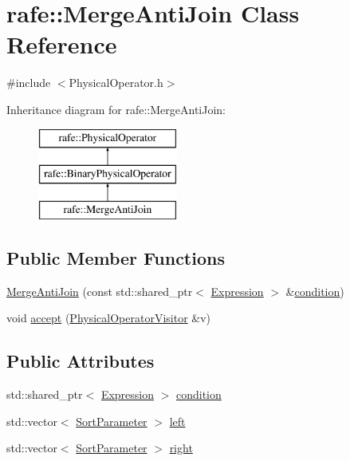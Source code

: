 \hypertarget{classrafe_1_1_merge_anti_join}{\section{rafe\+:\+:Merge\+Anti\+Join Class Reference}
\label{classrafe_1_1_merge_anti_join}
}


{\ttfamily \#include $<$Physical\+Operator.\+h$>$}

Inheritance diagram for rafe\+:\+:Merge\+Anti\+Join\+:\begin{figure}[H]
\begin{center}
\leavevmode
\includegraphics[height=3.000000cm]{classrafe_1_1_merge_anti_join}
\end{center}
\end{figure}
\subsection*{Public Member Functions}
\begin{DoxyCompactItemize}
\item 
\hyperlink{classrafe_1_1_merge_anti_join_ad67fe6bf33d22aa9e86cc7b022509adf}{Merge\+Anti\+Join} (const std\+::shared\+\_\+ptr$<$ \hyperlink{classrafe_1_1_expression}{Expression} $>$ \&\hyperlink{classrafe_1_1_merge_anti_join_a25262bcb30b68e719e540c6237f56228}{condition})
\item 
void \hyperlink{classrafe_1_1_merge_anti_join_aae93ebacaaed68ab8af8f38a09cfe8e7}{accept} (\hyperlink{classrafe_1_1_physical_operator_visitor}{Physical\+Operator\+Visitor} \&v)
\end{DoxyCompactItemize}
\subsection*{Public Attributes}
\begin{DoxyCompactItemize}
\item 
std\+::shared\+\_\+ptr$<$ \hyperlink{classrafe_1_1_expression}{Expression} $>$ \hyperlink{classrafe_1_1_merge_anti_join_a25262bcb30b68e719e540c6237f56228}{condition}
\item 
std\+::vector$<$ \hyperlink{classrafe_1_1_sort_parameter}{Sort\+Parameter} $>$ \hyperlink{classrafe_1_1_merge_anti_join_adde369c7d6dcdeb5530b40999af4c4c4}{left}
\item 
std\+::vector$<$ \hyperlink{classrafe_1_1_sort_parameter}{Sort\+Parameter} $>$ \hyperlink{classrafe_1_1_merge_anti_join_a278393533a0b0a6f3c38ba6810abf221}{right}
\end{DoxyCompactItemize}


